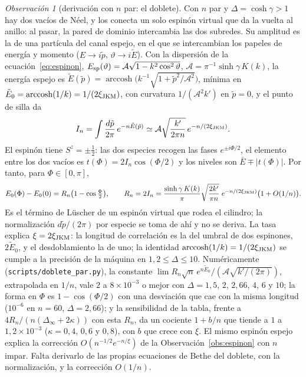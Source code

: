 \documentclass[11pt,a4paper]{article}
\theoremstyle{remark}
\newtheorem*{observacion}{Observación}
\begin{document}
\begin{observacion}[derivación con $n$ par: el doblete]\label{obs:doblete}
Con $n$ par y $\Delta=\cosh\gamma>1$ hay dos vacíos de Néel, y los conecta un solo espinón virtual
que da la vuelta al anillo: al pasar, la pared de dominio intercambia las dos subredes. Su amplitud
es la de una partícula del canal espejo, en el que se intercambian los papeles de energía y momento
($E\to i\tilde p$, $\vartheta\to i\tilde E$). Con la dispersión de la
ecuación~\eqref{eq:espinon}, $E_{\rm sp}(\vartheta)=\mathcal A\sqrt{1-k^2\cos^2\vartheta}$,
$\mathcal A=\pi^{-1}\sinh\gamma\,K(k)$, la energía espejo es
$\tilde E(\tilde p)=\operatorname{arccosh}\big(k^{-1}\sqrt{1+\tilde p^2/\mathcal A^2}\big)$, mínima en
$\tilde E_0=\operatorname{arccosh}(1/k)=1/(2\xi_{\rm JKM})$, con curvatura $1/(\mathcal A^2k')$ en
$\tilde p=0$, y el punto de silla da
\[
  I_n=\int\frac{d\tilde p}{2\pi}\,e^{-n\tilde E(\tilde p)}\simeq\mathcal A\sqrt{\frac{k'}{2\pi n}}\,
  e^{-n/(2\xi_{\rm JKM})}.
\]
El espinón tiene $S^z=\pm\tfrac12$: las dos especies recogen las fases $e^{\pm i\Phi/2}$, el
elemento entre los dos vacíos es $t(\Phi)=2I_n\cos(\Phi/2)$ y los niveles son $\bar E\mp|t(\Phi)|$.
Por tanto, para $\Phi\in[0,\pi]$,
\begin{equation}\label{eq:doblete}
  E_0(\Phi)-E_0(0)=R_n\big(1-\cos\tfrac\Phi2\big),\qquad
  R_n=2I_n=\frac{\sinh\gamma\,K(k)}\pi\sqrt{\frac{2k'}{\pi n}}\;e^{-n/(2\xi_{\rm JKM})}\big(1+O(1/n)\big).
\end{equation}
Es el término de Lüscher de un espinón virtual que rodea el cilindro; la normalización
$d\tilde p/(2\pi)$ por especie se toma de ahí y no se deriva. La tasa explica $\xi=2\xi_{\rm JKM}$:
la longitud de correlación es la del umbral de dos espinones, $2\tilde E_0$, y el desdoblamiento la
de uno; la identidad $\operatorname{arccosh}(1/k)=1/(2\xi_{\rm JKM})$ se cumple a la precisión de
la máquina en $1{,}2\le\Delta\le10$. Numéricamente (\texttt{scripts/doblete\_par.py}), la constante
$\lim R_n\sqrt n\,e^{n\tilde E_0}/(\mathcal A\sqrt{k'/(2\pi)})$, extrapolada en $1/n$, vale $2$ a
$8\times10^{-3}$ o mejor con $\Delta=1{,}5$, $2$, $2{,}66$, $4$, $6$ y $10$; la forma en $\Phi$ es
$1-\cos(\Phi/2)$ con una desviación que cae con la misma longitud ($10^{-6}$ en $n=60$,
$\Delta=2{,}66$); y la sensibilidad de la tabla, frente a $4R_n/(n(\Delta_\infty+2\kappa))$ con
esta $R_n$, da un cociente $1+b/n$ que tiende a $1$ a $1{,}2\times10^{-3}$ ($\kappa=0{,}4$, $0{,}6$ y
$0{,}8$), con $b$ que crece con $\xi$. El mismo espinón espejo explica la corrección
$O(n^{-1/2}e^{-n/\xi})$ de la Observación~\ref{obs:espinon} con $n$ impar. Falta derivarlo de las
propias ecuaciones de Bethe del doblete, con la normalización, y la corrección $O(1/n)$.
\end{observacion}
\end{document}
